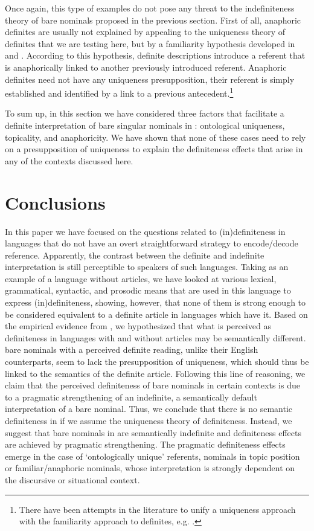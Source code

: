 \documentclass[output=paper]{langscibook}
\begin{document}
\noindent Once again, this type of examples do not pose any threat to the indefiniteness theory of bare nominals proposed in the previous section. First of all, anaphoric definites are usually not explained by appealing to the uniqueness theory of definites that we are testing here, but by a familiarity hypothesis developed in \citet{Kamp1981} and \citet{Heim1982}. According to this hypothesis, definite descriptions introduce a referent that is anaphorically linked to another previously introduced referent. Anaphoric definites need not have any uniqueness presupposition, their referent is simply established and identified by a link to a previous antecedent.\footnote{There have been attempts in the literature to unify a uniqueness approach with the familiarity approach to definites, e.g. \citet{farkas03}.}

To sum up, in this section we have considered three factors that facilitate a definite interpretation of bare singular nominals in : ontological uniqueness, topicality, and anaphoricity. We have shown that none of these cases need to rely on a presupposition of uniqueness to explain the definiteness effects that arise in any of the contexts discussed here.

\section{Conclusions}
In this paper we have focused on the questions related to (in)definiteness in languages that do not have an overt straightforward strategy to encode/decode reference. Apparently, the contrast between the definite and indefinite interpretation is still perceptible to speakers of such languages. Taking  as an example of a language without articles, we have looked at various lexical, grammatical, syntactic, and prosodic means that are used in this language to express (in)definiteness, showing, however, that none of them is strong enough to be considered equivalent to a definite article in languages which have it. Based on the empirical evidence from , we hypothesized that what is perceived as definiteness in languages with and without articles may be semantically different.  bare nominals with a perceived definite reading, unlike their English counterparts, seem to lack the presupposition of uniqueness, which should thus be linked to the semantics of
the definite article. Following this line of reasoning, we claim that the perceived definiteness of  bare nominals in certain contexts is due to a pragmatic strengthening of an indefinite, a semantically default interpretation of a bare nominal. Thus, we conclude that there is no semantic definiteness in  if we assume the uniqueness theory of definiteness. Instead, we suggest that bare nominals in  are semantically indefinite and definiteness effects are achieved by pragmatic strengthening. The pragmatic definiteness effects emerge in the case of `ontologically unique' referents, nominals in topic position or familiar/anaphoric nominals, whose interpretation is strongly dependent on the discursive or situational context.
\end{document}

